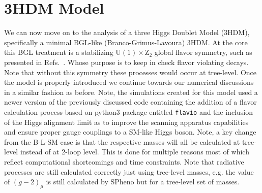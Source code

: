 %

\renewcommand{\cleardoublepage}{}
\renewcommand{\clearpage}{}

\chapter{3HDM Model}
\label{ch:3HDM}

We can now move on to the analysis of a three Higgs Doublet Model (3HDM), specifically a minimal BGL-like (Branco-Grimus-Lavoura) 3HDM. 
% 
At the core this BGL treatment is a stabilizing $\mathrm{U}(1) \times \mathrm{Z}_2$ global flavor symmetry, such as presented in Refs.~\cite{Ludvig_Thesis,Ian_Thesis}.
%
Whose purpose is to keep in check flavor violating decays. 
%
Note that without this symmetry these processes would occur at tree-level. 
%
Once the model is properly introduced we continue towards our numerical discussions in a similar fashion as before. 
%
Note, the simulations created for this model used a newer version of the previously discussed code containing the addition of a flavor calculation process based on python3 package entitled \texttt{flavio} \cite{straub2018flavio} and the inclusion of the Higgs alignment limit as to improve the scanning apparatus capabilities and ensure proper gauge couplings to a SM-like Higgs boson.
%
%
Note, a key change from the B-L-SM case is that the respective masses will all be calculated at tree-level instead of at 2-loop level. 
%
This is done for multiple reasons most of which reflect computational shortcomings and time constraints.
%
Note that radiative processes are still calculated correctly just using tree-level masses, e.g. the value of $(g-2)_\mu$ is still calculated by SPheno but for a tree-level set of masses.

%
%
%
%

